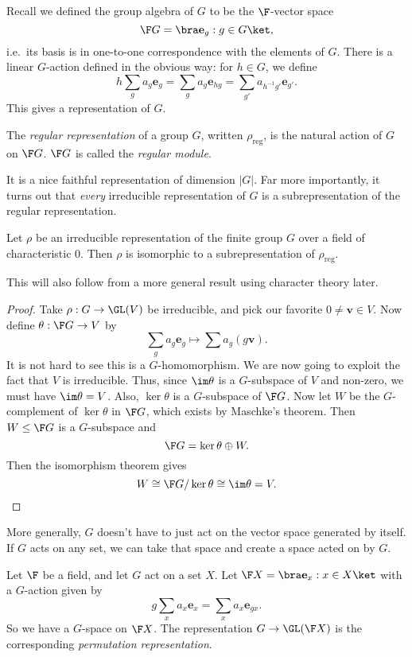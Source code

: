 \documentclass[a4paper]{article}
\begin{document}
Recall we defined the group algebra of $G$ to be the $\F$-vector space
\[
  \F G = \bra \mathbf{e}_g: g \in G\ket,
\]
i.e.\ its basis is in one-to-one correspondence with the elements of $G$. There is a linear $G$-action defined in the obvious way: for $h \in G$, we define
\[
  h \sum_g a_g \mathbf{e}_g = \sum_g a_g \mathbf{e}_{hg} = \sum_{g'} a_{h^{-1}g'} \mathbf{e}_{g'}.
\]
This gives a representation of $G$.
\begin{defi}
  The \emph{regular representation} of a group $G$, written $\rho_{\mathrm{reg}}$, is the natural action of $G$ on $\F G$. $\F G$ is called the \emph{regular module}.
\end{defi}
It is a nice faithful representation of dimension $|G|$. Far more importantly, it turns out that \emph{every} irreducible representation of $G$ is a subrepresentation of the regular representation.

\begin{prop}
  Let $\rho$ be an irreducible representation of the finite group $G$ over a field of characteristic 0. Then $\rho$ is isomorphic to a subrepresentation of $\rho_{\mathrm{reg}}$.
\end{prop}

This will also follow from a more general result using character theory later.
\begin{proof}
  Take $\rho: G \to \GL(V)$ be irreducible, and pick our favorite $0 \not= \mathbf{v} \in V$. Now define $\theta: \F G \to V$ by
  \[
    \sum_g a_g \mathbf{e}_g \mapsto \sum a_g (g\mathbf{v}).
  \]
  It is not hard to see this is a $G$-homomorphism. We are now going to exploit the fact that $V$ is irreducible. Thus, since $\im \theta$ is a $G$-subspace of $V$ and non-zero, we must have $\im \theta = V$. Also, $\ker \theta$ is a $G$-subspace of $\F G$. Now let $W$ be the $G$-complement of $\ker \theta$ in $\F G$, which exists by Maschke's theorem. Then $W \leq \F G$ is a $G$-subspace and
  \[
    \F G = \ker \theta \oplus W.
  \]
  Then the isomorphism theorem gives
  \[
    W\cong \F G / \ker \theta \cong \im \theta = V.
  \]
\end{proof}
More generally, $G$ doesn't have to just act on the vector space generated by itself. If $G$ acts on any set, we can take that space and create a space acted on by $G$.
\begin{defi}
  Let $\F$ be a field, and let $G$ act on a set $X$. Let $\F X = \bra \mathbf{e}_x: x \in X\ket$ with a $G$-action given by
  \[
    g \sum_x a_x \mathbf{e}_x = \sum_x a_x \mathbf{e}_{gx}.
  \]
  So we have a $G$-space on $\F X$. The representation $G \to \GL(\F X)$ is the corresponding \emph{permutation representation}.
\end{defi}
\end{document}

